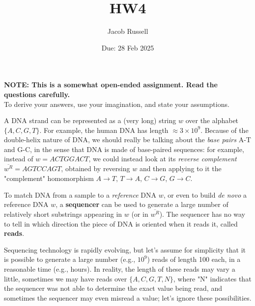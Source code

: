 \documentclass[12pt]{article}
\title{HW4}
\date{Due: 28 Feb 2025}
\begin{document}
\author{Jacob Russell}

\maketitle

\noindent \textbf{NOTE: This is a somewhat open-ended assignment. Read the questions carefully.}\\
To derive your answers, use your imagination, and state your assumptions.

\bigskip

A DNA strand can be represented as a (very long) string \( w \) over the alphabet \( \{ A, C, G, T \} \). 
For example, the human DNA has length \( \approx 3 \times 10^9 \). Because of the double-helix nature of DNA, we should really be talking about the \textit{base pairs} A-T and G-C, in the sense that DNA is made of base-paired sequences: for example, instead of \( w = ACTGGACT \), we could instead look at its \textit{reverse complement} \( \overline{w^R} = AGTCCAGT \), obtained by reversing \( w \) and then applying to it the "complement" homomorphism \( A \to T \), \( T \to A \), \( C \to G \), \( G \to C \).

\bigskip

To match DNA from a sample to a \textit{reference} DNA \( w \), or even to build \textit{de novo} a reference DNA \( w \), a \textbf{sequencer} can be used to generate a large number of relatively short substrings appearing in \( w \) (or in \( \overline{w^R}
 \)). The sequencer has no way to tell in which direction the piece of DNA is oriented when it reads it, called \textbf{reads}. 

\bigskip

Sequencing technology is rapidly evolving, but let’s assume for simplicity that it is possible to generate a large number (e.g., \( 10^9 \)) reads of length 100 each, in a reasonable time (e.g., hours). In reality, the length of these reads may vary a little, sometimes we may have reads over \( \{ A, C, G, T, N \} \), where "N" indicates that the sequencer was not able to determine the exact value being read, and sometimes the sequencer may even misread a value; let’s ignore these possibilities.

\bigskip
\end{document}
